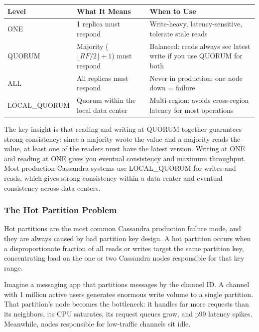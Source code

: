 \documentclass[11pt,a4paper]{article}
\begin{document}
\begin{center}
\renewcommand{\arraystretch}{1.4}
\begin{tabular}{p{3cm}p{5.5cm}p{5.5cm}}
\toprule
\textbf{Level} & \textbf{What It Means} & \textbf{When to Use} \\
\midrule
ONE & 1 replica must respond & Write-heavy, latency-sensitive, tolerate stale reads \\
QUORUM & Majority (\(\lfloor RF/2 \rfloor + 1\)) must respond & Balanced: reads always see latest write if you use QUORUM for both \\
ALL & All replicas must respond & Never in production; one node down = failure \\
LOCAL\_QUORUM & Quorum within the local data center & Multi-region: avoids cross-region latency for most operations \\
\bottomrule
\end{tabular}
\end{center}

The key insight is that reading and writing at QUORUM together guarantees strong consistency: since a majority wrote the value and a majority reads the value, at least one of the readers must have the latest version. Writing at ONE and reading at ONE gives you eventual consistency and maximum throughput. Most production Cassandra systems use LOCAL\_QUORUM for writes and reads, which gives strong consistency within a data center and eventual consistency across data centers.

\subsubsection{The Hot Partition Problem}

Hot partitions are the most common Cassandra production failure mode, and they are always caused by bad partition key design. A hot partition occurs when a disproportionate fraction of all reads or writes target the same partition key, concentrating load on the one or two Cassandra nodes responsible for that key range.

Imagine a messaging app that partitions messages by the channel ID. A channel with 1 million active users generates enormous write volume to a single partition. That partition's node becomes the bottleneck: it handles far more requests than its neighbors, its CPU saturates, its request queues grow, and p99 latency spikes. Meanwhile, nodes responsible for low-traffic channels sit idle.
\end{document}
